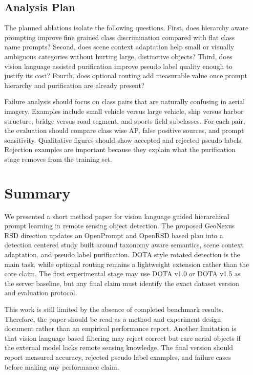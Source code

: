 \documentclass[10pt]{article}
\begin{document}
\subsection{Analysis Plan}

The planned ablations isolate the following questions. First, does hierarchy aware prompting improve fine grained class discrimination compared with flat class name prompts? Second, does scene context adaptation help small or visually ambiguous categories without hurting large, distinctive objects? Third, does vision language assisted purification improve pseudo label quality enough to justify its cost? Fourth, does optional routing add measurable value once prompt hierarchy and purification are already present?

Failure analysis should focus on class pairs that are naturally confusing in aerial imagery. Examples include small vehicle versus large vehicle, ship versus harbor structure, bridge versus road segment, and sports field subclasses. For each pair, the evaluation should compare class wise AP, false positive sources, and prompt sensitivity. Qualitative figures should show accepted and rejected pseudo labels. Rejection examples are important because they explain what the purification stage removes from the training set.

\section{Summary}

We presented a short method paper for vision language guided hierarchical prompt learning in remote sensing object detection. The proposed GeoNexus RSD direction updates an OpenPrompt and OpenRSD based plan into a detection centered study built around taxonomy aware semantics, scene context adaptation, and pseudo label purification. DOTA style rotated detection is the main task, while optional routing remains a lightweight extension rather than the core claim. The first experimental stage may use DOTA v1.0 or DOTA v1.5 as the server baseline, but any final claim must identify the exact dataset version and evaluation protocol.

This work is still limited by the absence of completed benchmark results. Therefore, the paper should be read as a method and experiment design document rather than an empirical performance report. Another limitation is that vision language based filtering may reject correct but rare aerial objects if the external model lacks remote sensing knowledge. The final version should report measured accuracy, rejected pseudo label examples, and failure cases before making any performance claim.
\end{document}
